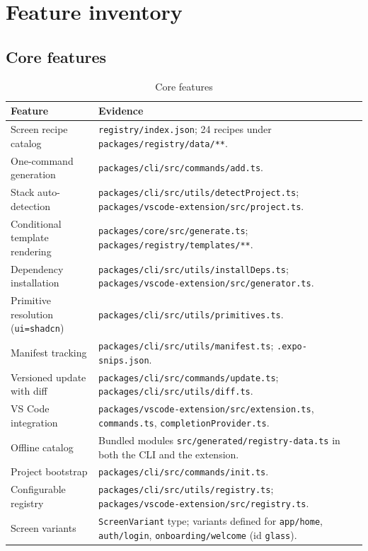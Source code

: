 \section{Feature inventory}

\subsection*{Core features}
\begin{longtable}{p{4.4cm}p{10cm}}
\caption{Core features}\\
\toprule
\textbf{Feature} & \textbf{Evidence} \\
\midrule

Screen recipe catalog & \texttt{registry/index.json}; 24 recipes under \texttt{packages/registry/data/**}. \\
One-command generation & \texttt{packages/cli/src/commands/add.ts}. \\
Stack auto-detection & \texttt{packages/cli/src/utils/detectProject.ts}; \texttt{packages/vscode-extension/src/project.ts}. \\
Conditional template rendering & \texttt{packages/core/src/generate.ts}; \texttt{packages/registry/templates/**}. \\
Dependency installation & \texttt{packages/cli/src/utils/installDeps.ts}; \texttt{packages/vscode-extension/src/generator.ts}. \\
Primitive resolution (\texttt{ui=shadcn}) & \texttt{packages/cli/src/utils/primitives.ts}. \\
Manifest tracking & \texttt{packages/cli/src/utils/manifest.ts}; \texttt{.expo-snips.json}. \\
Versioned update with diff & \texttt{packages/cli/src/commands/update.ts}; \texttt{packages/cli/src/utils/diff.ts}. \\
VS Code integration & \texttt{packages/vscode-extension/src/extension.ts}, \texttt{commands.ts}, \texttt{completionProvider.ts}. \\
Offline catalog & Bundled modules \texttt{src/generated/registry-data.ts} in both the CLI and the extension. \\
Project bootstrap & \texttt{packages/cli/src/commands/init.ts}. \\
Configurable registry & \texttt{packages/cli/src/utils/registry.ts}; \texttt{packages/vscode-extension/src/registry.ts}. \\
Screen variants & \texttt{ScreenVariant} type; variants defined for \texttt{app/home}, \texttt{auth/login}, \texttt{onboarding/welcome} (id \texttt{glass}). \\
\bottomrule
\end{longtable}

